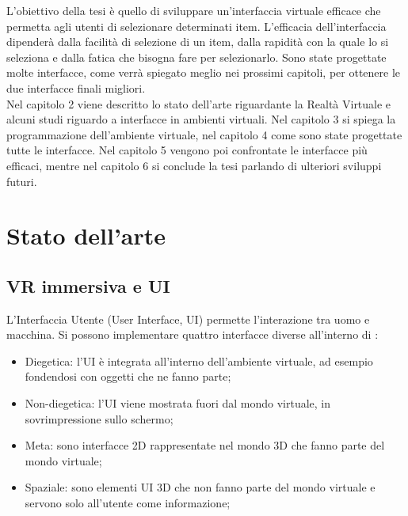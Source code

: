 \documentclass[target=bach,aauheader=]{thud}
\begin{document}
\newpage
L'obiettivo della tesi è quello di sviluppare un'interfaccia virtuale efficace che permetta agli utenti di selezionare determinati item.
L'efficacia dell'interfaccia dipenderà dalla facilità di selezione di un item, dalla rapidità con la quale lo si seleziona e dalla fatica che bisogna fare per selezionarlo.
Sono state progettate molte interfacce, come verrà spiegato meglio nei prossimi capitoli, per ottenere le due interfacce finali migliori. \\


Nel capitolo 2 viene descritto lo stato dell'arte riguardante la Realtà Virtuale e alcuni studi riguardo a interfacce in ambienti virtuali.
Nel capitolo 3 si spiega la programmazione dell'ambiente virtuale, nel capitolo 4 come sono state progettate tutte le interfacce.
Nel capitolo 5 vengono poi confrontate le interfacce più efficaci, mentre nel capitolo 6 si conclude la tesi parlando di ulteriori sviluppi futuri.


\chapter{Stato dell'arte} %
\section{VR immersiva e UI}
L'Interfaccia Utente (User Interface, UI) permette l'interazione tra uomo e macchina.
Si possono implementare quattro interfacce diverse all'interno di :
\begin{itemize}
    \item Diegetica: l'UI è integrata all'interno dell'ambiente virtuale, ad esempio fondendosi con oggetti che ne fanno parte;
    \item Non-diegetica: l'UI viene mostrata fuori dal mondo virtuale, in sovrimpressione sullo schermo;
    \item Meta: sono interfacce 2D rappresentate nel mondo 3D che fanno parte del mondo virtuale;
    \item Spaziale: sono elementi UI 3D che non fanno parte del mondo virtuale e servono solo all'utente come informazione;
\end{itemize} 
\end{document}

